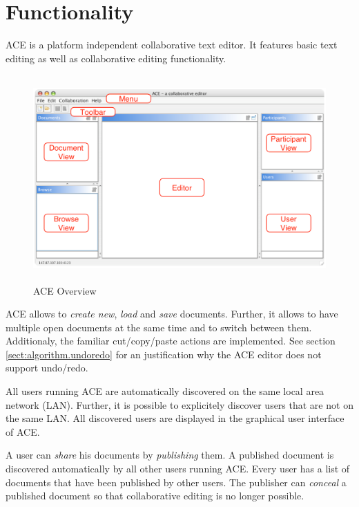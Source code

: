 \chapter{Functionality}
\label{chapter:functionality}

ACE is a platform independent collaborative text editor. It features basic text editing as well as collaborative editing functionality.

\begin{figure}[H]
\begin{center}
  \includegraphics[height=3.1in, width=5.1in]{../images/finalreport/application_ace_overview.eps}
\caption{ACE Overview}
\end{center}
\end{figure}

ACE allows to \emph{create new}, \emph{load} and \emph{save} documents. Further, it allows to have multiple open documents at the same time and to switch between them. Additionaly, the familiar cut/copy/paste actions are implemented. See section \ref{sect:algorithm.undoredo} for an justification why the ACE editor does not support undo/redo.

All users running ACE are automatically discovered on the same local area network (LAN). Further, it is possible to explicitely discover users that are not on the same LAN. All discovered users are displayed in the graphical user interface of ACE.

A user can \emph{share} his documents by \emph{publishing} them. A published document is discovered automatically by all other users running ACE. Every user has a list of documents that have been published by other users. The publisher can \emph{conceal} a published document so that collaborative editing is no longer possible.

